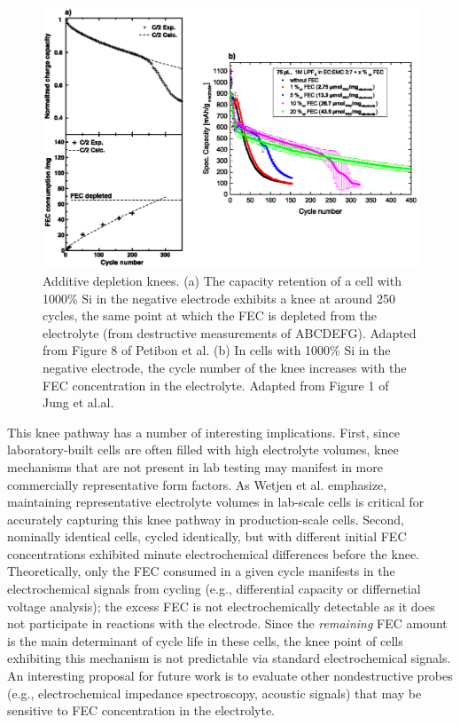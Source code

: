 \documentclass{article}
\begin{document}
\begin{figure}[ht]
\centering
\includegraphics[scale = 0.7]{figures/fec_depletion.eps}
\caption{Additive depletion knees.
(a) The capacity retention of a cell with 1000\% Si in the negative electrode exhibits a knee at around 250 cycles, the same point at which the FEC is depleted from the electrolyte (from destructive measurements of ABCDEFG). Adapted from Figure 8 of Petibon et al.\cite{petibon_studies_2016}
(b) In cells with 1000\% Si in the negative electrode, the cycle number of the knee increases with the FEC concentration in the electrolyte. Adapted from Figure 1 of Jung et al.al.\cite{jung_consumption_2016}}
\label{fig:knee_definition}
\end{figure}

This knee pathway has a number of interesting implications.
First, since laboratory-built cells are often filled with high electrolyte volumes, knee mechanisms that are not present in lab testing may manifest in more commercially representative form factors.
As Wetjen et al.\cite{wetjen_differentiating_2017} emphasize,
maintaining representative electrolyte volumes in lab-scale cells is critical for accurately capturing this knee pathway in production-scale cells.
Second, nominally identical cells, cycled identically, but with different initial FEC concentrations exhibited minute electrochemical differences before the knee.\cite{jung_consumption_2016}
Theoretically, only the FEC consumed in a given cycle manifests in the electrochemical signals from cycling (e.g., differential capacity or differnetial voltage analysis); the excess FEC is not electrochemically detectable as it does not participate in reactions with the electrode.
Since the \emph{remaining} FEC amount is the main determinant of cycle life in these cells, the knee point of cells exhibiting this mechanism is not predictable via standard electrochemical signals.
An interesting proposal for future work is to evaluate other nondestructive probes (e.g., electrochemical impedance spectroscopy\cite{zhang_identifying_2020}, acoustic signals\cite{knehr_understanding_2018}) that may be sensitive to FEC concentration in the electrolyte.
\end{document}
